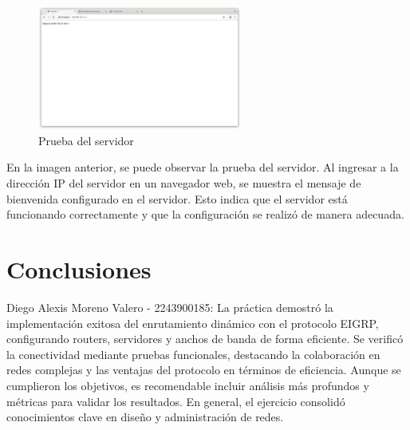     \begin{figure}[H]
        \centering
        \includegraphics[width=0.6\textwidth]{img/prueba.png}
        \caption{Prueba del servidor}
        \label{fig:prueba}
    \end{figure}
    En la imagen anterior, se puede observar la prueba del servidor. Al ingresar a la dirección IP del servidor en un navegador web, se muestra el mensaje de bienvenida configurado en el servidor. Esto indica que el servidor está funcionando correctamente y que la configuración se realizó de manera adecuada.
    
        
    


\section{Conclusiones}

    Diego Alexis Moreno Valero - 2243900185: La práctica demostró la implementación exitosa del enrutamiento dinámico con el protocolo EIGRP, configurando routers, servidores y anchos de banda de forma eficiente. Se verificó la conectividad mediante pruebas funcionales, destacando la colaboración en redes complejas y las ventajas del protocolo en términos de eficiencia. Aunque se cumplieron los objetivos, es recomendable incluir análisis más profundos y métricas para validar los resultados. En general, el ejercicio consolidó conocimientos clave en diseño y administración de redes.

